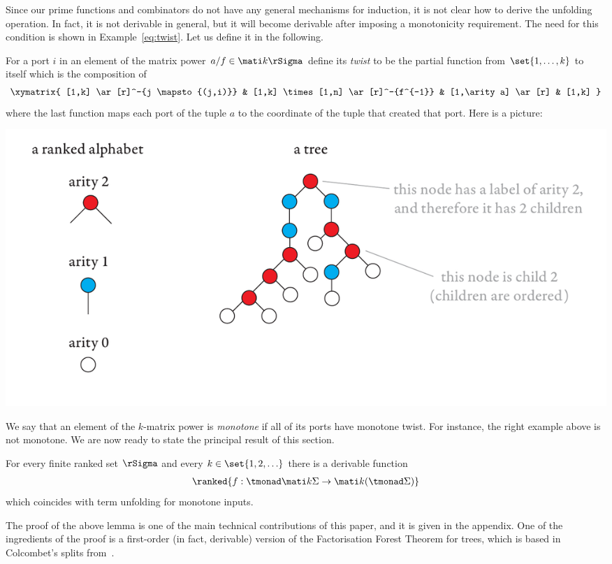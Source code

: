 Since our prime functions and combinators do not have any general mechanisms for induction, it is not clear how to derive the unfolding operation. In fact, it is not derivable in general, but it will become derivable after imposing a monotonicity requirement. The need for this condition is shown in Example~\ref{eq:twist}.  Let us define it in the following.

For a port $i$ in an element of the matrix power $a/f \in \mati k \rSigma$ define its \emph{twist} to be the partial function from $\set{1,\ldots,k}$ to itself 
which is the composition of 
\begin{align*}
\xymatrix{
    [1,k] \ar[r]^-{j \mapsto {(j,i)}} & [1,k] \times [1,n] \ar[r]^-{f^{-1}} & [1,\arity a] \ar[r] & [1,k]
}
\end{align*}
where the last function maps each port of the tuple $a$ to the coordinate of the tuple that created that port. Here is a picture:
\begin{center}
\includegraphics[scale=.3, page=87]{pics.pdf}
\end{center}
 We say that an element of the $k$-matrix power is \emph{monotone} if all of its ports have monotone twist. For instance, the right example above is not monotone.
 We are now ready to state the principal result of this section.

\begin{proposition}\label{prop:monotone-unfold}
    For every finite ranked set $\rSigma$ and every $k \in \set{1,2,\ldots}$ there is a derivable function 
    \begin{align*}
    \ranked{ f : \tmonad \mati k \Sigma \to \mati k {(\tmonad \Sigma)}}
    \end{align*}
    which coincides with term unfolding for monotone inputs.
\end{proposition}
The proof of the  above lemma is one of the main technical contributions of this paper, and it is given in the appendix. One of the ingredients of the proof is a first-order (in fact, derivable) version of the Factorisation Forest Theorem for trees, which is based in Colcombet's splits from~\cite{colcombetCombinatorialTheoremTrees2007}.  

